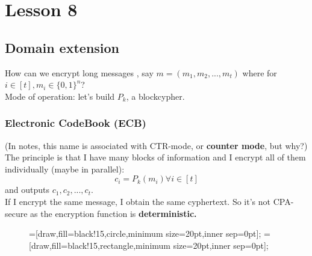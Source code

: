 \chapter*{Lesson 8}
\section{Domain extension}

How can we encrypt long messages , say $m=(m_{1}, m_{2}, ..., m_{t})$ where
for $i \in [t], m_{i} \in \{0,1\}^{n} $?\\

Mode of operation: let's build $P_{k}$, a blockcypher.\\

\subsection{Electronic CodeBook (ECB)}

(In notes, this name is associated with CTR-mode, or \textbf{counter mode}, but
why?)\\
The principle is that I have many blocks of information and I encrypt all of
them individually (maybe in parallel):
\[
    c_{i}=P_{k}(m_{i}) \forall i \in [t]
\]
and outputs $c_{1}, c_{2}, ..., c_{t}$.\\

If I encrypt the same message, I obtain the same cyphertext. So it's not
CPA-secure as the encryption function is \textbf{deterministic.}

\begin{figure}[h!]
=[draw,fill=black!15,circle,minimum size=20pt,inner sep=0pt];
=[draw,fill=black!15,rectangle,minimum size=20pt,inner
sep=0pt];
\centering
{}
\end{figure}

